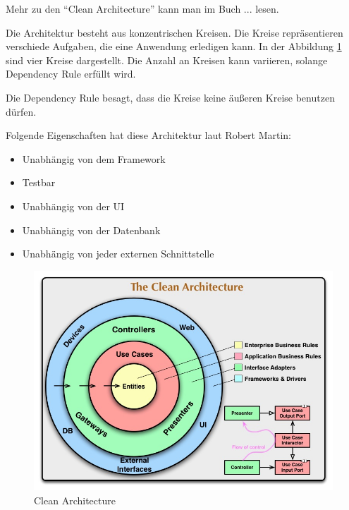 Mehr zu den ``Clean Architecture'' kann man im Buch ... lesen.

Die Architektur besteht aus konzentrischen Kreisen. Die Kreise repräsentieren verschiede Aufgaben, die eine Anwendung erledigen kann.
In der Abbildung \ref{fig:Clean Architecture} sind vier Kreise dargestellt. Die Anzahl an Kreisen kann variieren, solange Dependency Rule erfüllt wird.

Die Dependency Rule besagt, dass die Kreise keine äußeren Kreise benutzen dürfen.

Folgende Eigenschaften hat diese Architektur laut Robert Martin:
\begin{itemize}
    \item Unabhängig von dem Framework
    \item Testbar
    \item Unabhängig von der UI
    \item Unabhängig von der Datenbank
    \item Unabhängig von jeder externen Schnittstelle
\end{itemize}

\begin{figure}[H]
    \centering
    \includegraphics[width=1\textwidth]{./images/CleanArchitecture.jpg}
    \caption[Clean Architecture]{Clean Architecture \footnotemark}
    \label{fig:Clean Architecture}
\end{figure}
